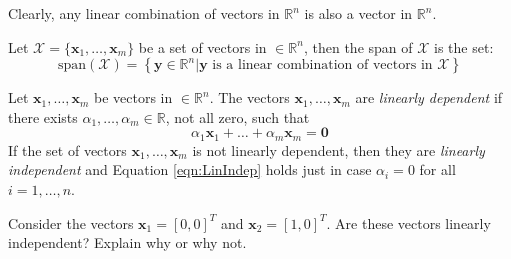 Clearly, any linear combination of vectors in $\mathbb{R}^n$ is also a vector in $\mathbb{R}^n$.

\begin{definition}[Span] Let $\mathcal{X} = \{\mathbf{x}_1,\dots,\mathbf{x}_m\}$ be a set of vectors in $\in \mathbb{R}^n$, then the span of $\mathcal{X}$ is the set:
\begin{equation}
\mathrm{span}(\mathcal{X}) = \left\{\mathbf{y} \in \mathbb{R}^n | \text{$\mathbf{y}$ is a linear combination of vectors in $\mathcal{X}$}\right\}
\end{equation}
\end{definition}

\begin{definition} Let $\mathbf{x}_1,\dots,\mathbf{x}_m$ be vectors in $\in \mathbb{R}^n$. The vectors $\mathbf{x}_1,\dots,\mathbf{x}_m$ are \textit{linearly dependent} if there exists $\alpha_1,\dots,\alpha_m \in \mathbb{R}$, not all zero, such that 
\begin{equation}
\alpha_1\mathbf{x}_1 + \dots + \alpha_m\mathbf{x}_m = \mathbf{0} 
\label{eqn:LinIndep}
\end{equation}
If the set of vectors $\mathbf{x}_1,\dots,\mathbf{x}_m$ is not linearly dependent, then they are \textit{linearly independent} and Equation \ref{eqn:LinIndep} holds just in case $\alpha_i = 0$ for all $i=1,\dots,n$. 
\end{definition}

\begin{exercise} Consider the vectors $\mathbf{x}_1 = [0,0]^T$ and $\mathbf{x}_2 = [1,0]^T$. Are these vectors linearly independent? Explain why or why not.
\end{exercise}

